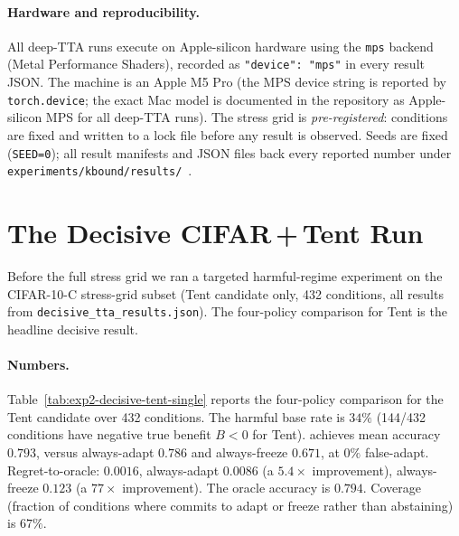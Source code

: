\paragraph{Hardware and reproducibility.}
All deep-TTA runs execute on Apple-silicon hardware using the
\texttt{mps} backend (Metal Performance Shaders), recorded as
\texttt{"device": "mps"} in every result JSON.  The machine is an Apple M5
Pro (the MPS device string is reported by \texttt{torch.device}; the exact
Mac model is documented in the repository as Apple-silicon MPS for all
deep-TTA runs).  The stress grid is \emph{pre-registered}: conditions are
fixed and written to a lock file before any result is observed.  Seeds are
fixed (\texttt{SEED=0}); all result manifests and JSON files back every
reported number under
\texttt{experiments/kbound/results/}~\cite{kbound2026repo}.

\section{The Decisive CIFAR\,+\,Tent Run}\label{sec:exp2-cifar-tent}

Before the full stress grid we ran a targeted harmful-regime experiment on
the CIFAR-10-C stress-grid subset (Tent candidate only, 432 conditions, all
results from \texttt{decisive\_tta\_results.json}).  The four-policy
comparison for Tent is the headline decisive result.

\paragraph{Numbers.}
Table~\ref{tab:exp2-decisive-tent-single} reports the four-policy comparison
for the Tent candidate over 432 conditions.  The harmful base rate is $34\%$
(144/432 conditions have negative true benefit $B{<}0$ for Tent).
\KGA{} achieves mean accuracy $0.793$, versus always-adapt $0.786$ and
always-freeze $0.671$, at $0\%$ false-adapt.  Regret-to-oracle: \KGA{}
$0.0016$, always-adapt $0.0086$ (a $5.4{\times}$ improvement), always-freeze
$0.123$ (a $77{\times}$ improvement).  The oracle accuracy is $0.794$.
Coverage (fraction of conditions where \KGA{} commits to adapt or freeze
rather than abstaining) is $67\%$.

